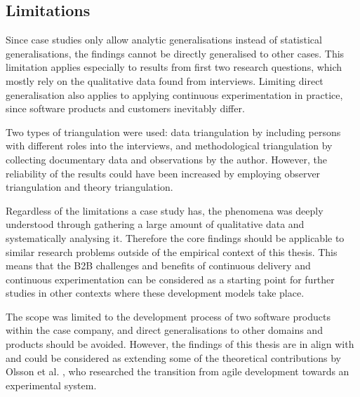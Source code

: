 \documentclass[english]{tktltiki2}
\theoremstyle{definition}
\theoremstyle{remark}
\begin{document}

\subsection{Limitations}
Since case studies only allow analytic generalisations instead of statistical generalisations, the findings cannot be directly generalised to other cases. This limitation applies especially to results from first two research questions, which mostly rely on the qualitative data found from interviews. Limiting direct generalisation also applies to applying continuous experimentation in practice, since software products and customers inevitably differ. 

Two types of triangulation were used: data triangulation by including persons with different roles into the interviews, and methodological triangulation by collecting documentary data and observations by the author. However, the reliability of the results could have been increased by employing observer triangulation and theory triangulation. 

Regardless of the limitations a case study has, the phenomena was deeply understood through gathering a large amount of qualitative data and systematically analysing it. %
Therefore the core findings should be applicable to similar research problems outside of the empirical context of this thesis. This means that the B2B challenges and benefits of continuous delivery and continuous experimentation can be considered as a starting point for further studies in other contexts where these development models take place.

The scope was limited to the development process of two software products within the case company, and direct generalisations to other domains and products should be avoided. However, the findings of this thesis are in align with and could be considered as extending some of the theoretical contributions by Olsson et al. \cite{olsson2012climbing}, who researched the transition from agile development towards an experimental system. 
\end{document}
